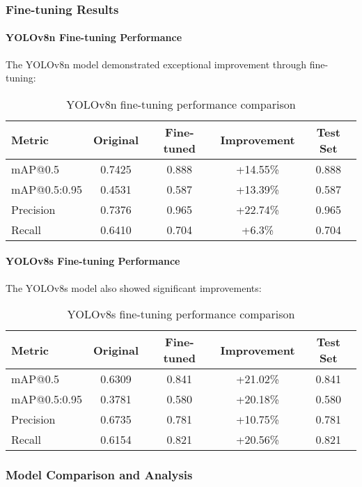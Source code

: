\documentclass[12pt,a4paper]{article}
\begin{document}
\subsubsection{Fine-tuning Results}

\paragraph{YOLOv8n Fine-tuning Performance}
The YOLOv8n model demonstrated exceptional improvement through fine-tuning:
\begin{table}[H]
\centering
\begin{tabular}{lcccc}
\toprule
\textbf{Metric} & \textbf{Original} & \textbf{Fine-tuned} & \textbf{Improvement} & \textbf{Test Set} \\
\midrule
mAP@0.5 & 0.7425 & 0.888 & +14.55\% & 0.888 \\
mAP@0.5:0.95 & 0.4531 & 0.587 & +13.39\% & 0.587 \\
Precision & 0.7376 & 0.965 & +22.74\% & 0.965 \\
Recall & 0.6410 & 0.704 & +6.3\% & 0.704 \\
\bottomrule
\end{tabular}
\caption{YOLOv8n fine-tuning performance comparison}
\label{tab:yolov8n_finetune}
\end{table}

\paragraph{YOLOv8s Fine-tuning Performance}
The YOLOv8s model also showed significant improvements:
\begin{table}[H]
\centering
\begin{tabular}{lcccc}
\toprule
\textbf{Metric} & \textbf{Original} & \textbf{Fine-tuned} & \textbf{Improvement} & \textbf{Test Set} \\
\midrule
mAP@0.5 & 0.6309 & 0.841 & +21.02\% & 0.841 \\
mAP@0.5:0.95 & 0.3781 & 0.580 & +20.18\% & 0.580 \\
Precision & 0.6735 & 0.781 & +10.75\% & 0.781 \\
Recall & 0.6154 & 0.821 & +20.56\% & 0.821 \\
\bottomrule
\end{tabular}
\caption{YOLOv8s fine-tuning performance comparison}
\label{tab:yolov8s_finetune}
\end{table}

\subsubsection{Model Comparison and Analysis}
\end{document}
